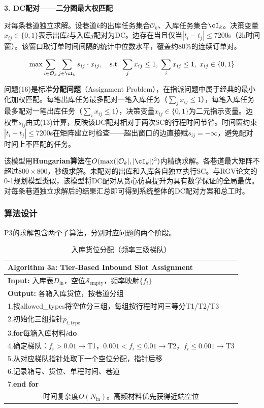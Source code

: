 \documentclass[a4paper]{cumcmthesis}
\newcommand{\headcol}{\rowcolor{tableheadcolor}}
\newcommand{\cO}{\mathcal{O}}
\begin{document}
\textbf{3. DC配对——二分图最大权匹配}

对每条巷道独立求解。设巷道$k$的出库任务集合$\cO_k$、入库任务集合$\cI_k$。决策变量$x_{ij}\in\{0,1\}$表示出库$i$与入库$j$配对为DC。边存在当且仅当$|t_i-t_j|\leq 7200$s（2h时间窗）。该窗口取订单时间间隔的统计中位数水平，覆盖约80\%的连续订单对。

\begin{equation}
\max\sum_{i\in\cO_k}\sum_{j\in\cI_k}s_{ij}\cdot x_{ij},\quad\text{s.t.}\;\sum_j x_{ij}\leq 1,\;\sum_i x_{ij}\leq 1,\;x_{ij}\in\{0,1\}
\end{equation}

问题(16)是标准\textbf{分配问题}（Assignment Problem），在指派问题中属于经典的最小化加权匹配。每笔出库任务最多配对一笔入库任务（$\sum_j x_{ij}\leq 1$），每笔入库任务最多配对一笔出库任务（$\sum_i x_{ij}\leq 1$），决策变量$x_{ij}\in\{0,1\}$为二元指示变量。边权重$s_{ij}$由式(13)计算，反映该DC配对相对于两次SC的行程时间节省。时间窗约束$|t_i-t_j|\leq 7200$s在矩阵建立时检查——超出窗口的边直接赋$s_{ij}=-\infty$，避免配对时间上不匹配的任务。

该模型用\textbf{Hungarian算法}在$O(\max(|\cO_k|,|\cI_k|)^3)$内精确求解。各巷道最大矩阵不超过$800\times 800$，秒级求解。未配对的出库和入库各自独立执行SC。与RGV论文的0-1规划模型类似，该模型将DC配对从贪心仿真提升为具有数学保证的全局最优。对每条巷道独立求解后的结果汇总即可得到系统整体的DC配对方案和总工时。

\FloatBarrier\subsubsection{算法设计}

P3的求解包含两个子算法，分别对应问题的两个阶段。

\begin{table}[htbp]
\centering\footnotesize
\caption{入库货位分配（频率三级梯队）}
\label{tab:algo3a}
\begin{tabular}{p{}}
\toprule
\headcol \textbf{Algorithm 3a: Tier-Based Inbound Slot Assignment}\\
\midrule
\textbf{Input:} 入库表$D_{\text{in}}$，空位$\mathcal{S}_{\text{empty}}$，频率映射$\{f_i\}$\\
\textbf{Output:} 各箱入库货位，按巷道分组\\
\midrule
1.\quad 按allowed\_types将空位分三组，每组按行程时间三等分T1/T2/T3\\
2.\quad 初始化三组指针$p_{t,\text{type}}$\\
3.\quad \textbf{for}每箱入库材料$i$\textbf{do}\\
4.\quad\qquad 确定梯队：$f_i>0.01\to$T1，$0.001<f_i\leq 0.01\to$T2，$f_i\leq 0.001\to$T3\\
5.\quad\qquad 从对应梯队指针处取下一个空位分配，指针后移\\
6.\quad\qquad 记录箱号、货位、单程时间、巷道\\
7.\quad \textbf{end for}\\
\midrule
\multicolumn{1}{c}{时间复杂度$O(N_{\text{in}})$。高频材料优先获得近端空位}\\
\bottomrule
\end{tabular}
\end{table}
\end{document}
